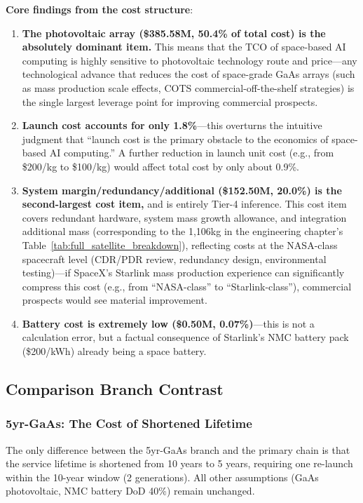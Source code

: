 \textbf{Core findings from the cost structure}:

\begin{enumerate}[leftmargin=*]
    \item \textbf{The photovoltaic array (\$385.58M, 50.4\% of total cost) is the absolutely dominant item.} This means that the TCO of space-based AI computing is highly sensitive to photovoltaic technology route and price---any technological advance that reduces the cost of space-grade GaAs arrays (such as mass production scale effects, COTS commercial-off-the-shelf strategies) is the single largest leverage point for improving commercial prospects.
    \item \textbf{Launch cost accounts for only 1.8\%}---this overturns the intuitive judgment that ``launch cost is the primary obstacle to the economics of space-based AI computing.'' A further reduction in launch unit cost (e.g., from \$200/kg to \$100/kg) would affect total cost by only about 0.9\%.
    \item \textbf{System margin/redundancy/additional (\$152.50M, 20.0\%) is the second-largest cost item,} and is entirely Tier-4 inference. This cost item covers redundant hardware, system mass growth allowance, and integration additional mass (corresponding to the 1,106\;kg in the engineering chapter's Table~\ref{tab:full_satellite_breakdown}), reflecting costs at the NASA-class spacecraft level (CDR/PDR review, redundancy design, environmental testing)---if SpaceX's Starlink mass production experience can significantly compress this cost (e.g., from ``NASA-class'' to ``Starlink-class''), commercial prospects would see material improvement.
    \item \textbf{Battery cost is extremely low (\$0.50M, 0.07\%)}---this is not a calculation error, but a factual consequence of Starlink's NMC battery pack (\$200/kWh) already being a space battery.
\end{enumerate}

\subsection{Comparison Branch Contrast}

\subsubsection{5yr-GaAs: The Cost of Shortened Lifetime}

The only difference between the 5yr-GaAs branch and the primary chain is that the service lifetime is shortened from 10 years to 5 years, requiring one re-launch within the 10-year window (2 generations). All other assumptions (GaAs photovoltaic, NMC battery DoD 40\%) remain unchanged.

